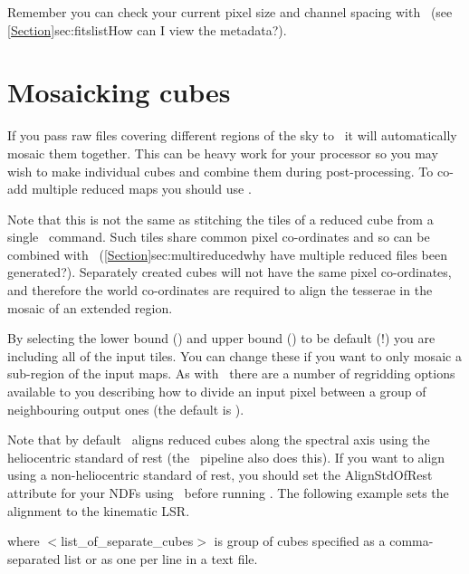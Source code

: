 \documentclass[11pt,oneside,chapters]{starlink}
\providecommand{\att}[1]{\textsf{#1}}
\begin{document}
Remember you can check your current pixel size and channel spacing
with \ndftrace\ (see \cref{Section}{sec:fitslist}{How can I view the
metadata?}).

\section{Mosaicking cubes}
\label{sec:mosaic}

If you pass raw files covering different regions of the sky to
\makecube\ it will automatically mosaic them together. This can be
heavy work for your processor so you may wish to make individual cubes
and combine them during post-processing. To co-add multiple reduced
maps you should use \wcsmosaic.

Note that this is not the same as stitching the tiles of a reduced cube
from a single \makecube\ command.  Such tiles share common pixel
co-ordinates and so can be combined with \paste\
(\cref{Section}{sec:multireduced}{why have multiple reduced files been
generated?}). Separately created
cubes will not have the same pixel co-ordinates, and therefore the
world co-ordinates are required to align the tesserae in the mosaic of
an extended region.

\begin{terminalv}
\end{terminalv}
By selecting the lower bound () and upper bound
() to be default (!) you are including all of the input
tiles. You can change these if you want to only mosaic a sub-region of
the input maps. As with \makecube\ there are a number of regridding
options available to you describing how to divide an input pixel
between a group of neighbouring output ones (the default is
).

Note that by default \wcsmosaic\ aligns reduced cubes along the
spectral axis using the heliocentric standard of rest (the \oracdr\ 
pipeline also does this).  If you want to align using
a non-heliocentric standard of rest, you should set the
\att{AlignStdOfRest} attribute for your NDFs using \wcsattrib\ 
before running \wcsmosaic.
The following example sets the alignment to the kinematic LSR.

\begin{terminalv}
\end{terminalv}

where $<$list\_of\_separate\_cubes$>$ is group of cubes specified
as a comma-separated list or as one per line in a text file.
\end{document}
